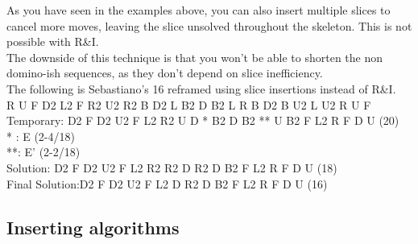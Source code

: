 \documentclass[11pt,a4paper]{book}
\newcommand{\p}{\textquotesingle}
\newcommand{\ps}{\p\,\,}
\begin{document}
As you have seen in the examples above, you can also insert multiple slices to cancel more moves, leaving the slice unsolved throughout the skeleton. This is not possible with R\&I.\\
The downside of this technique is that you won’t be able to shorten the non domino-ish sequences, as they don’t depend on slice inefficiency.\\
\newline
The following is Sebastiano’s 16 reframed using slice insertions instead of R\&I.\\
\newline
R\ps U\ps F D2 L2 F R2 U2 R2 B D2 L B2 D\ps B2 L\ps R\ps B D2 B U2 L U2 R\ps U\ps F\\
\newline
Temporary: D2 F\ps D2 U2 F\ps L2 R2 U\ps D * B2 D B2 ** U B2 F L2 R\ps F\ps D U\ps (20)\\
* : E (2-4/18)\\
**: E' (2-2/18)\\
Solution: D2 F\ps D2 U2 F\ps L2 R2 R2 D R2 D  B2 F L2 R\ps F\ps D U\ps  (18)\\
\newline
Final Solution:D2 F\ps D2 U2 F\ps L2 D R2 D  B2 F L2 R\ps F\ps D U\ps (16)\\
\newpage
\subsection{Inserting algorithms}
\end{document}
